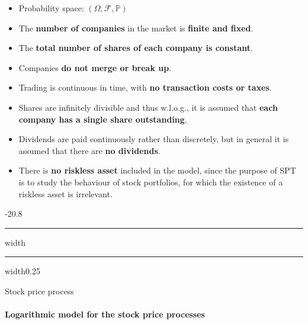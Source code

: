 \documentclass[a4paper,landscape,8pt,fleqn]{scrartcl}
\makeatletter
\renewcommand{\emph}[1]{\textbf{#1}}
\renewcommand{\subsection}{\@startsection{subsection}{1}{0mm}%
{-2\baselineskip}{0.8\baselineskip}%
{\hrule depth 0.2pt width\columnwidth\hrule depth0.75pt
width0.25\columnwidth\vspace*{1.2em}\large\bfseries}}
\makeatother
\begin{document}
\begin{multicols*}{3}
\begin{itemize}
\item Probability space: $\left( \Omega,\mathcal{F},\mathbb{P} \right)$
\item The \emph{number of companies} in the market is \emph{finite and fixed}.
\item The \emph{total number of shares of each company is constant}.
\item Companies \emph{do not merge or break up}.
\item Trading is continuous in time, with \emph{no transaction costs or taxes}.
\item Shares are infinitely divisible and thus w.l.o.g., it is assumed that \emph{each company has a single share outstanding}.
\item Dividends are paid continuously rather than discretely, but in general it is assumed that there are \emph{no dividends}.
\item There is \emph{no riskless asset} included in the model, since the purpose of SPT is to study the behaviour of stock portfolios, for which the existence of a riskless asset is irrelevant.
\end{itemize}

\subsection{Stock price process}

\paragraph{Logarithmic model for the stock price processes}


\end{multicols*}
\end{document}
